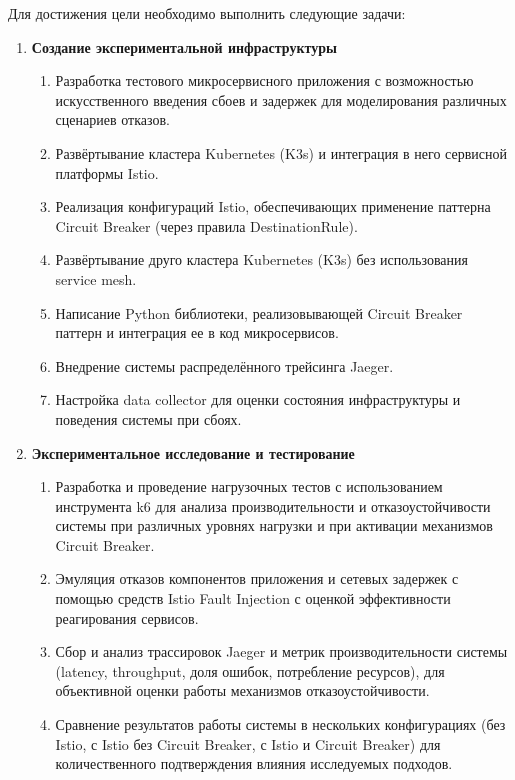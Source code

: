 Для достижения цели необходимо выполнить следующие задачи:
    \begin{enumerate}    
      \item \textbf{Создание экспериментальной инфраструктуры}
      \begin{enumerate}
        \item Разработка тестового микросервисного приложения с возможностью искусственного введения сбоев и задержек для моделирования различных сценариев отказов.
        \item Развёртывание кластера Kubernetes (K3s) и интеграция в него сервисной платформы Istio.
        \item Реализация конфигураций Istio, обеспечивающих применение паттерна Circuit Breaker (через правила DestinationRule).
        \item Развёртывание друго кластера Kubernetes (K3s) без использования service mesh.
        \item Написание Python библиотеки, реализовывающей Circuit Breaker паттерн и интеграция ее в код микросервисов.
        \item Внедрение системы распределённого трейсинга Jaeger.
        \item Настройка data collector для оценки состояния инфраструктуры и поведения системы при сбоях.
      \end{enumerate}
    
      \item \textbf{Экспериментальное исследование и тестирование}
      \begin{enumerate}
        \item Разработка и проведение нагрузочных тестов с использованием инструмента k6 для анализа производительности и отказоустойчивости системы при различных уровнях нагрузки и при активации механизмов Circuit Breaker.
        \item Эмуляция отказов компонентов приложения и сетевых задержек с помощью средств Istio Fault Injection с оценкой эффективности реагирования сервисов.
        \item Сбор и анализ трассировок Jaeger и метрик производительности системы (latency, throughput, доля ошибок, потребление ресурсов), для объективной оценки работы механизмов отказоустойчивости.
        \item Сравнение результатов работы системы в нескольких конфигурациях (без Istio, с Istio без Circuit Breaker, с Istio и Circuit Breaker) для количественного подтверждения влияния исследуемых подходов.
      \end{enumerate}
    

\end{enumerate}
